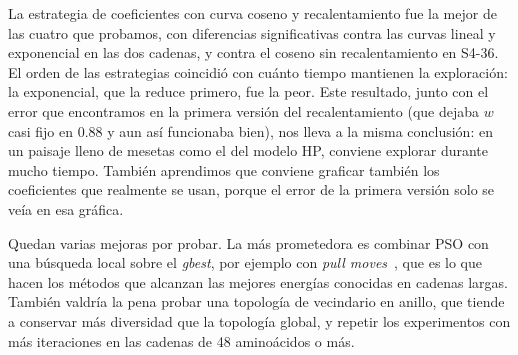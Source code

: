 La estrategia de coeficientes con curva coseno y recalentamiento fue la mejor de las cuatro que probamos, con diferencias significativas contra las curvas lineal y exponencial en las dos cadenas, y contra el coseno sin recalentamiento en S4-36. El orden de las estrategias coincidió con cuánto tiempo mantienen la exploración: la exponencial, que la reduce primero, fue la peor. Este resultado, junto con el error que encontramos en la primera versión del recalentamiento (que dejaba $w$ casi fijo en 0.88 y aun así funcionaba bien), nos lleva a la misma conclusión: en un paisaje lleno de mesetas como el del modelo HP, conviene explorar durante mucho tiempo. También aprendimos que conviene graficar también los coeficientes que realmente se usan, porque el error de la primera versión solo se veía en esa gráfica.

Quedan varias mejoras por probar. La más prometedora es combinar PSO con una búsqueda local sobre el \textit{gbest}, por ejemplo con \textit{pull moves}~\cite{lesh2003complete}, que es lo que hacen los métodos que alcanzan las mejores energías conocidas en cadenas largas. También valdría la pena probar una topología de vecindario en anillo, que tiende a conservar más diversidad que la topología global, y repetir los experimentos con más iteraciones en las cadenas de 48 aminoácidos o más.
